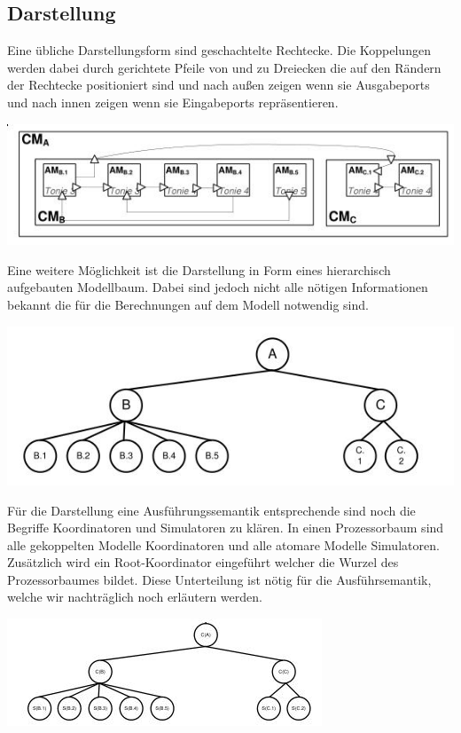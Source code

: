\documentclass[11pt, fleqn, a4paper, leqno]{scrartcl} %
\begin{document}
	\subsection{Darstellung}
		Eine übliche Darstellungsform sind geschachtelte Rechtecke. Die Koppelungen werden dabei durch gerichtete Pfeile von und zu Dreiecken die auf den Rändern der Rechtecke positioniert sind und nach außen zeigen wenn sie Ausgabeports und nach innen zeigen wenn sie Eingabeports repräsentieren.
		\begin{center}
			\includegraphics[scale=0.6]{images/devs-boxes.jpg}
		\end{center}
		Eine weitere Möglichkeit ist die Darstellung in Form eines hierarchisch aufgebauten Modellbaum. Dabei sind jedoch nicht alle nötigen Informationen bekannt die für die Berechnungen auf dem Modell notwendig sind.
		\begin{center}
			\includegraphics[scale=0.5]{images/devs-baum.jpg}
		\end{center}
		Für die Darstellung eine Ausführungssemantik entsprechende sind noch die Begriffe Koordinatoren und Simulatoren zu klären. In einen Prozessorbaum sind alle gekoppelten Modelle Koordinatoren und alle atomare Modelle Simulatoren. Zusätzlich wird ein Root-Koordinator eingeführt welcher die Wurzel des Prozessorbaumes bildet. Diese Unterteilung ist nötig für die Ausführsemantik, welche wir nachträglich noch erläutern werden.
	\begin{center}
			\includegraphics[scale=0.5]{images/devs-prozessorbaum.jpg}
	\end{center}
\end{document}
